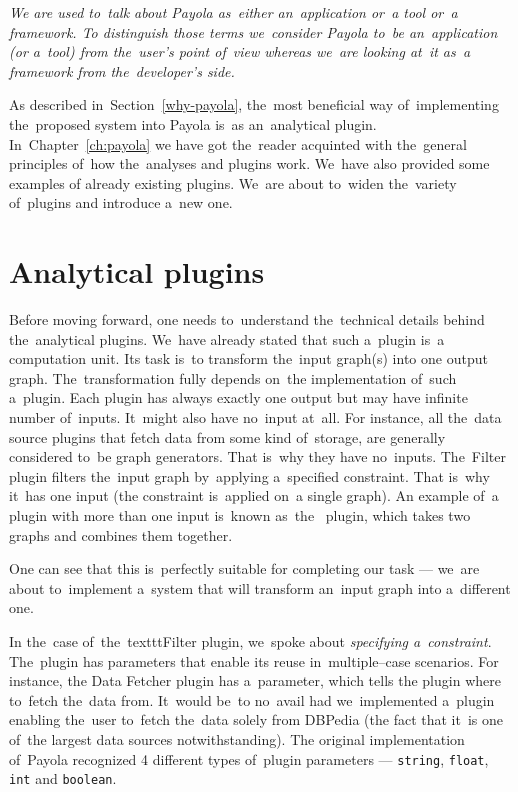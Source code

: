 \emph{We are used to~talk about Payola as~either an~application or~a tool or~a framework. To
distinguish those terms we~consider Payola to~be an~application (or a~tool) from the~user’s
point of~view whereas we~are looking at~it as~a framework from the~developer’s side.}

As described in~Section~\ref{why-payola}, the~most beneficial way of~implementing the~proposed system into Payola is~as an~analytical plugin. In~Chapter~\ref{ch:payola}
we have got the~reader acquinted with the~general principles of~how the~analyses and plugins work. We~have also provided some examples 
of already existing plugins. We~are about to~widen the~variety of~plugins and 
introduce a~new one.

\section{Analytical plugins}
Before moving forward, one needs to~understand the~technical 
details behind the~analytical plugins. We~have already stated that such a~plugin is~a computation unit. Its task is~to transform the~input graph(s) into one output 
graph. The~transformation fully depends on~the implementation of~such a~plugin. Each plugin has always exactly one output but may have infinite number of~inputs. It~might also have no~input at~all. For instance, all the~data 
source plugins that fetch data from some kind of~storage, are generally considered to~be
graph generators. That is~why they have no~inputs. The~Filter 
plugin filters the~input graph by~applying a~specified constraint. That is~why it~has one input (the constraint is~applied on~a single graph).
An example of~a plugin with more than one input is~known as~the~ 
plugin, which takes two graphs and combines them together.

One can see that this is~perfectly suitable for completing our task --- we~are about to~implement a~system that will transform an~input graph into a~different one.

In the~case of~the~texttt{Filter} plugin, we~spoke about \emph{specifying a~constraint}. The~plugin has parameters that enable its reuse in~multiple--case scenarios. For instance,
the Data Fetcher plugin has a~parameter, which tells 
the plugin where to~fetch the~data from. It~would be~to no~avail had we~implemented a~plugin
enabling the~user to~fetch the~data solely from DBPedia (the fact that it~is one of~the largest data
sources notwithstanding).
The original implementation of~Payola recognized 4 different types of~plugin 
parameters --- \texttt{string}, \texttt{float}, \texttt{int} and \texttt{boolean}. 

